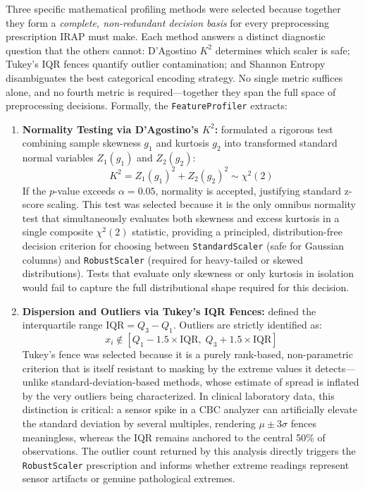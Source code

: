 \documentclass[MTech]{ugthesis}
\begin{document}
Three specific mathematical profiling methods were selected because together they form a \emph{complete, non-redundant decision basis} for every preprocessing prescription IRAP must make. Each method answers a distinct diagnostic question that the others cannot: D'Agostino $K^2$ determines which scaler is safe; Tukey's IQR fences quantify outlier contamination; and Shannon Entropy disambiguates the best categorical encoding strategy. No single metric suffices alone, and no fourth metric is required---together they span the full space of preprocessing decisions. Formally, the \texttt{FeatureProfiler} extracts:
\begin{enumerate}
    \item \textbf{Normality Testing via D'Agostino's $K^2$:} \citet{dagostino1973tests} formulated a rigorous test combining sample skewness $g_1$ and kurtosis $g_2$ into transformed standard normal variables $Z_1(g_1)$ and $Z_2(g_2)$:
    \begin{equation}
        K^2 = Z_1(g_1)^2 + Z_2(g_2)^2 \sim \chi^2(2)
    \end{equation}
    If the $p$-value exceeds $\alpha = 0.05$, normality is accepted, justifying standard z-score scaling. This test was selected because it is the only omnibus normality test that simultaneously evaluates both skewness and excess kurtosis in a single composite $\chi^2(2)$ statistic, providing a principled, distribution-free decision criterion for choosing between \texttt{StandardScaler} (safe for Gaussian columns) and \texttt{RobustScaler} (required for heavy-tailed or skewed distributions). Tests that evaluate only skewness or only kurtosis in isolation would fail to capture the full distributional shape required for this decision.
    \item \textbf{Dispersion and Outliers via Tukey's IQR Fences:} \citet{tukey1977exploratory} defined the interquartile range $\text{IQR} = Q_3 - Q_1$. Outliers are strictly identified as:
    \begin{equation}
        x_i \notin [Q_1 - 1.5 \times \text{IQR}, \; Q_3 + 1.5 \times \text{IQR}]
    \end{equation}
    Tukey's fence was selected because it is a purely rank-based, non-parametric criterion that is itself resistant to masking by the extreme values it detects---unlike standard-deviation-based methods, whose estimate of spread is inflated by the very outliers being characterized. In clinical laboratory data, this distinction is critical: a sensor spike in a CBC analyzer can artificially elevate the standard deviation by several multiples, rendering $\mu \pm 3\sigma$ fences meaningless, whereas the IQR remains anchored to the central 50\% of observations. The outlier count returned by this analysis directly triggers the \texttt{RobustScaler} prescription and informs whether extreme readings represent sensor artifacts or genuine pathological extremes.

\end{enumerate}
\end{document}
